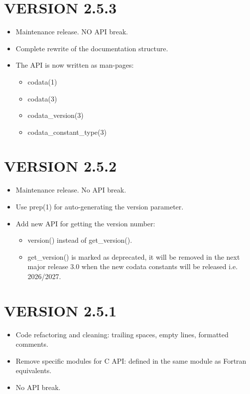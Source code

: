 \section*{VERSION 2.5.3}
\begin{itemize}
\item Maintenance release. NO API break.
\item Complete rewrite of the documentation structure.
\item The API is now written as man-pages:
\begin{itemize}
\item codata(1)
\item codata(3)
\item codata\_version(3)
\item codata\_constant\_type(3)
\end{itemize}
\end{itemize}

\section*{VERSION 2.5.2}
\begin{itemize}
\item Maintenance release. No API break.
\item Use prep(1) for auto-generating the version parameter.
\item Add new API for getting the version number:
\begin{itemize}
\item version() instead of get\_version().
\item get\_version() is marked as deprecated, it will be removed in the
      next major release 3.0 when the new codata constants will be 
      released i.e. 2026/2027.
\end{itemize}
\end{itemize}



\section*{VERSION 2.5.1}
\begin{itemize}
\item Code refactoring and cleaning: trailing spaces, empty lines, formatted comments.
\item Remove specific modules for C API: defined in the same module as Fortran equivalents.
\item No API break.
\end{itemize}



